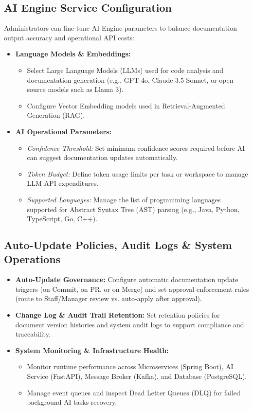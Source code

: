 \subsection{AI Engine Service Configuration}
Administrators can fine-tune AI Engine parameters to balance documentation output accuracy and operational API costs:
\begin{itemize}
    \item \textbf{Language Models \& Embeddings:}
    \begin{itemize}
        \item Select Large Language Models (LLMs) used for code analysis and documentation generation (e.g., GPT-4o, Claude 3.5 Sonnet, or open-source models such as Llama 3).
        \item Configure Vector Embedding models used in Retrieval-Augmented Generation (RAG).
    \end{itemize}
    \item \textbf{AI Operational Parameters:}
    \begin{itemize}
        \item \textit{Confidence Threshold:} Set minimum confidence scores required before AI can suggest documentation updates automatically.
        \item \textit{Token Budget:} Define token usage limits per task or workspace to manage LLM API expenditures.
        \item \textit{Supported Languages:} Manage the list of programming languages supported for Abstract Syntax Tree (AST) parsing (e.g., Java, Python, TypeScript, Go, C++).
    \end{itemize}
\end{itemize}

\subsection{Auto-Update Policies, Audit Logs \& System Operations}
\begin{itemize}
    \item \textbf{Auto-Update Governance:} Configure automatic documentation update triggers (on Commit, on PR, or on Merge) and set approval enforcement rules (route to Staff/Manager review vs. auto-apply after approval).
    \item \textbf{Change Log \& Audit Trail Retention:} Set retention policies for document version histories and system audit logs to support compliance and traceability.
    \item \textbf{System Monitoring \& Infrastructure Health:}
    \begin{itemize}
        \item Monitor runtime performance across Microservices (Spring Boot), AI Service (FastAPI), Message Broker (Kafka), and Database (PostgreSQL).
        \item Manage event queues and inspect Dead Letter Queues (DLQ) for failed background AI tasks recovery.
    \end{itemize}
\end{itemize}